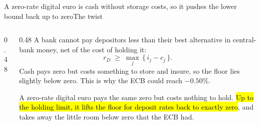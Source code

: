 \documentclass[aspectratio=169,9pt]{beamer}
\begin{document}
\begin{frame}{A zero-rate digital euro is cash without storage costs, so it pushes the lower bound back up to zero}{The twist}
  \begin{columns}[c]
    \begin{column}{0.48\textwidth}
    \end{column}
    \begin{column}{0.48\textwidth}
      \small
      A bank cannot pay depositors less than their best alternative in central-bank money, net of the cost of holding it:
      \[
        r_D \;\ge\; \max_j\,\{\, i_j - c_j \,\}.
      \]
      Cash pays zero but costs something to store and insure, so the floor lies slightly below zero. This is why the ECB could reach $-0.50\%$.

      \vspace{0.5em}
      A zero-rate digital euro pays the same zero but costs nothing to hold. \hl{Up to the holding limit, it lifts the floor for deposit rates back to exactly zero}, and takes away the little room below zero that the ECB had.
    \end{column}
  \end{columns}
\end{frame}
\end{document}
